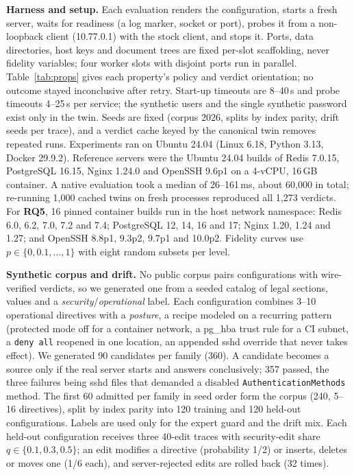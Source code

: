 \documentclass[conference]{IEEEtran}
\newcommand{\RQ}[1]{\textbf{RQ#1}}
\begin{document}
\textbf{Harness and setup.} Each evaluation renders the configuration, starts a fresh server, waits for readiness (a log marker, socket or port), probes it from a non-loopback client (10.77.0.1) with the stock client, and stops it. Ports, data directories, host keys and document trees are fixed per-slot scaffolding, never fidelity variables; four worker slots with disjoint ports run in parallel. Table~\ref{tab:props} gives each property's policy and verdict orientation; no outcome stayed inconclusive after retry. Start-up timeouts are 8--40\,s and probe timeouts 4--25\,s per service; the synthetic users and the single synthetic password exist only in the twin. Seeds are fixed (corpus 2026, splits by index parity, drift seeds per trace), and a verdict cache keyed by the canonical twin removes repeated runs. Experiments ran on Ubuntu 24.04 (Linux 6.18, Python 3.13, Docker 29.9.2). Reference servers were the Ubuntu 24.04 builds of Redis 7.0.15, PostgreSQL 16.15, Nginx 1.24.0 and OpenSSH 9.6p1 on a 4-vCPU, 16\,GB container. A native evaluation took a median of 26--161\,ms, about 60,000 in total; re-running 1,000 cached twins on fresh processes reproduced all 1,273 verdicts. For \RQ{5}, 16 pinned container builds run in the host network namespace: Redis 6.0, 6.2, 7.0, 7.2 and 7.4; PostgreSQL 12, 14, 16 and 17; Nginx 1.20, 1.24 and 1.27; and OpenSSH 8.8p1, 9.3p2, 9.7p1 and 10.0p2. Fidelity curves use $p\in\{0,0.1,\dots,1\}$ with eight random subsets per level.

\textbf{Synthetic corpus and drift.} No public corpus pairs configurations with wire-verified verdicts, so we generated one from a seeded catalog of legal sections, values and a \emph{security}/\emph{operational} label. Each configuration combines 3--10 operational directives with a \emph{posture}, a recipe modeled on a recurring pattern (protected mode off for a container network, a pg\_hba trust rule for a CI subnet, a \texttt{deny all} reopened in one location, an appended sshd override that never takes effect). We generated 90 candidates per family (360). A candidate becomes a source only if the real server starts and answers conclusively; 357 passed, the three failures being sshd files that demanded a disabled \texttt{AuthenticationMethods} method. The first 60 admitted per family in seed order form the corpus (240, 5--16 directives), split by index parity into 120 training and 120 held-out configurations. Labels are used only for the expert guard and the drift mix. Each held-out configuration receives three 40-edit traces with security-edit share $q\in\{0.1,0.3,0.5\}$; an edit modifies a directive (probability 1/2) or inserts, deletes or moves one (1/6 each), and server-rejected edits are rolled back (32 times).
\end{document}
